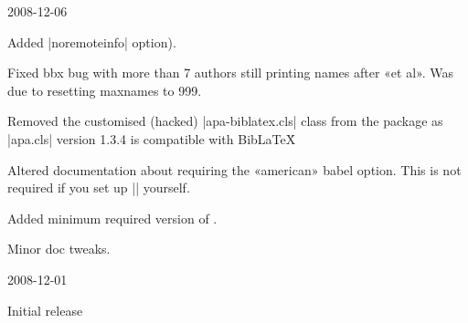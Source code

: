 \documentclass{ltxdockit}
\begin{document}
\begin{changelog}
\begin{release}{0.2}{2008-12-06}
\item Added |noremoteinfo| option).
\item Fixed bbx bug with more than 7 authors still printing names after «et al». Was
  due to resetting maxnames to 999.
\item Removed the customised (hacked) |apa-biblatex.cls| class from the package as
  |apa.cls| version 1.3.4 is compatible with Bib\LaTeX\.
\item Altered documentation about requiring the «american» babel option.
  This is not required if you set up |\DeclareQuotePunctuation| yourself.
\item Added minimum required version of .
\item Minor doc tweaks.
\end{release}

\begin{release}{0.1}{2008-12-01}
\item Initial release
\end{release}



\end{changelog}
\end{document}
